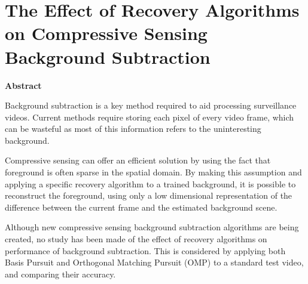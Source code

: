 
\graphicspath{{Chapter4/figures/}} 

\chapter{The Effect of Recovery Algorithms on Compressive Sensing Background Subtraction}
\label{chap:CSBGS}

\begin{center}
  \textbf{Abstract}
\end{center}

Background subtraction is a key method required to aid processing surveillance videos. Current methods require storing each pixel of every video frame, which can be wasteful as most of this information refers to the uninteresting background. 

Compressive sensing can offer an efficient solution by using the fact that foreground is often sparse in the spatial domain. By making this assumption and applying a specific recovery algorithm to a trained background, it is possible to reconstruct the foreground, using only a low dimensional representation of the difference between the current frame and the estimated background scene. 

Although new compressive sensing background subtraction algorithms are being created, no study has been made of the effect of recovery algorithms on performance of background subtraction. This is considered by applying both Basis Pursuit and Orthogonal Matching Pursuit (OMP) to a standard test video, and comparing their accuracy. 



